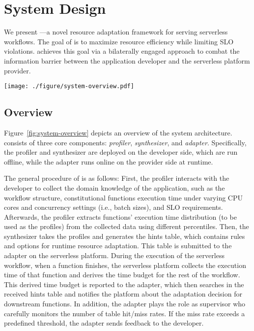 \section{\namex System Design}
\label{sec:system-overview}
We present \namex---a novel resource adaptation framework for serving serverless workflows.
The goal of \namex is to maximize resource efficiency while limiting SLO violations. \namex achieves this goal via a bilaterally engaged approach to combat the information barrier between the application developer and the serverless platform provider. 

\begin{figure*}[t!]
\centering
\texttt{[image: ./figure/system-overview.pdf]}
\caption{An overview of the system architecture of \namex. The proposed runtime resource adaptation framework bilaterally engages the application developer and the serverless platform provider, where the developer is responsible for the offline part while the provider is responsible for the online part.}
\label{fig:system-overview}
\end{figure*}

\subsection{Overview}
\label{sec:system-overview:fig}
Figure~\ref{fig:system-overview} depicts an overview of the system architecture. 
\namex consists of three core components: \emph{profiler}, \emph{synthesizer}, and \emph{adapter}. 
Specifically, the profiler and synthesizer are deployed on the developer side, which are run offline, while the adapter runs online on the provider side at runtime.

The general procedure of \namex is as follows: First, the profiler interacts with the developer to collect the domain knowledge of the application, such as the workflow structure, constitutional functions execution time under varying CPU cores and concurrency settings (i.e., batch sizes), and SLO requirements.
Afterwards, the profiler extracts functions' execution time distribution (to be used as the profiles) from the collected data using different percentiles.
Then, the synthesizer takes the profiles and generates the hints table, which contains rules and options for runtime resource adaptation.
This table is submitted to the adapter on the serverless platform.
During the execution of the serverless workflow, when a function finishes, the serverless platform collects the execution time of that function and derives the time budget for the rest of the workflow.
This derived time budget is reported to the adapter, which then searches in the received hints table and notifies the platform about the adaptation decision for downstream functions.
In addition, the adapter plays the role as supervisor who carefully monitors the number of table hit/miss rates.
If the miss rate exceeds a predefined threshold, the adapter sends feedback to the developer.
% 

